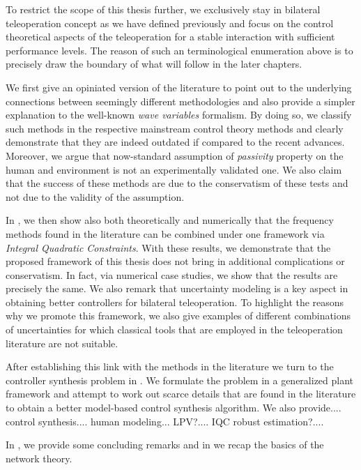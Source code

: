 To restrict the scope of this thesis further, we exclusively stay in bilateral teleoperation concept as we have defined previously and focus on the control theoretical aspects of the teleoperation for a stable interaction with sufficient performance levels. The reason of such an terminological enumeration above is to precisely draw the boundary of what will follow in the later chapters. 

We first give an opiniated version of the literature to point out to the underlying connections between seemingly different methodologies and also provide a simpler explanation to the well-known \emph{wave variables} formalism. By doing so, we classify such methods in the respective mainstream control theory methods and clearly demonstrate that they are indeed outdated if compared to the recent advances. Moreover, we argue that now-standard assumption of \emph{passivity} property on the human and environment is not an experimentally validated one. We also claim that the success of these methods are due to the conservatism of these tests and not due to the validity of the assumption.

In , we then show also both theoretically and numerically that the frequency methods found in the literature can be combined under one framework via \emph{Integral Quadratic Constraints}. With these results, we demonstrate that the proposed framework of this thesis does not bring in additional complications or conservatism. In fact, via numerical case studies, we show that the results are precisely the same. We also remark that uncertainty modeling is a key aspect in obtaining better controllers for bilateral teleoperation. To highlight the reasons why we promote this framework, we also give examples of different combinations of uncertainties for which classical tools that are employed in the teleoperation literature are not suitable. 


After establishing this link with the methods in the literature we turn to the controller synthesis problem in . We formulate the problem in a generalized plant framework and attempt to work out scarce details that are found in the literature to obtain a better model-based control synthesis algorithm.  We also provide.... control synthesis.... human modeling... LPV?.... IQC robust estimation?....

In , we provide some concluding remarks and in  we recap the basics of the network theory.

